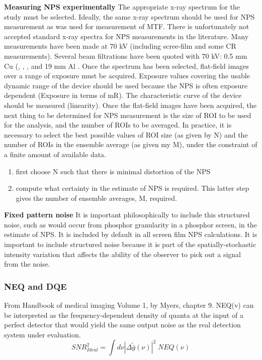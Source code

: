 \textbf{Measuring NPS experimentally}
The appropriate x-ray spectrum for the study must be selected.  Ideally, the same x-ray spectrum should be used for NPS measurement as was used for measurement of MTF.  There is unfortunately not accepted standard x-ray spectra for NPS measurements in the literature.  Many measurements have been made at 70 kV (including scree-film and some CR measurements).  Several beam filtrations have been quoted with 70 kV: 0.5 mm Cu (\citep{Dobbins1995}, \citep{Bradford1999}, \citep{Hillen1987}, \citep{Chotas1997} and 19 mm Al \citep{Samei1997}.
Once the spectrum has been selected, flat-field images over a range of exposure must be acquired.  Exposure values covering the usable dynamic range of the device should be used because the NPS is often exposure dependent (Exposure in terms of mR).  The characteristic curve of the device should be measured (linearity).
Once the flat-field images have been acquired, the next thing to be determined for NPS measurement is the size of ROI to be used for the analysis, and the number of ROIs to be averaged.    In practice, it is necessary to select the best possible values of ROI size (as given by N) and the number of ROIs in the ensemble average (as given my M), under the constraint of a finite amount of available data.  
\begin{enumerate}
\item first choose N such that there is minimal distortion of the NPS
\item compute what certainty in the estimate of NPS is required.  This latter step gives the number of ensemble averages, M, required.
\end{enumerate}

\textbf{Fixed pattern noise}
It is important philosophically to include this structured noise, such as would occur from phosphor granularity in a phosphor screen, in the estimate of NPS.  It is included by default in all screen film NPS calculations.  It is important to include structured noise because it is part of the spatially-stochastic intensity variation that affects the ability of the observer to pick out a signal from the noise.   
\subsubsection{NEQ and DQE}

From Handbook of medical imaging Volume 1, by Myers, chapter 9.
NEQ(v) can be interpreted as the frequency-dependent density of quanta at the input of a perfect detector that would yield the same output noise as the real detection system under evaluation.
\begin{equation}
SNR^2_{Ideal} = \int d \nu |\Delta \tilde{\bar{g}}(\nu)|^2 \; NEQ(\nu)
\end{equation}